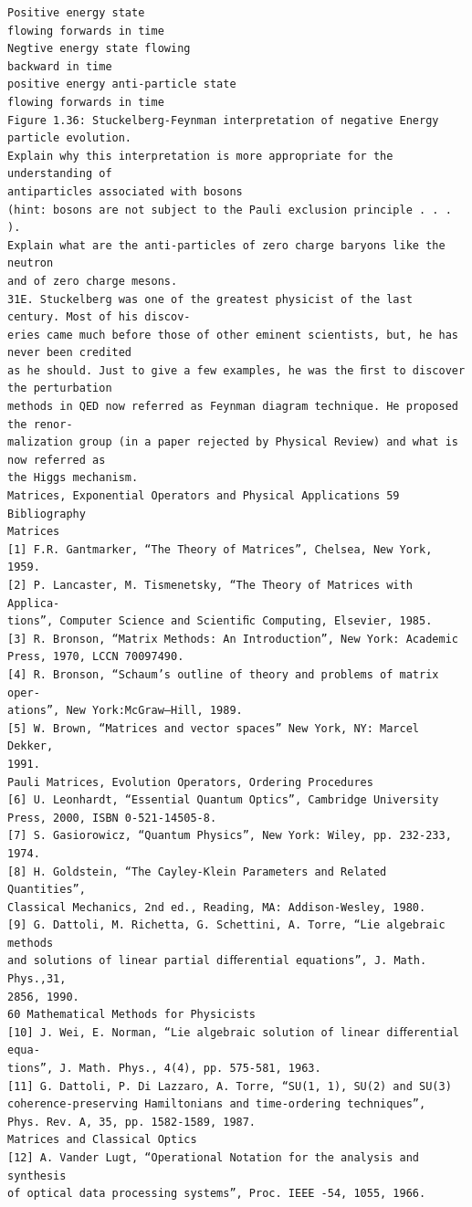 \begin{verbatim}
Positive energy state
flowing forwards in time
Negtive energy state flowing
backward in time
positive energy anti-particle state
flowing forwards in time
Figure 1.36: Stuckelberg-Feynman interpretation of negative Energy particle evolution.
Explain why this interpretation is more appropriate for the understanding of
antiparticles associated with bosons
(hint: bosons are not subject to the Pauli exclusion principle . . . ).
Explain what are the anti-particles of zero charge baryons like the neutron
and of zero charge mesons.
31E. Stuckelberg was one of the greatest physicist of the last century. Most of his discov-
eries came much before those of other eminent scientists, but, he has never been credited
as he should. Just to give a few examples, he was the ﬁrst to discover the perturbation
methods in QED now referred as Feynman diagram technique. He proposed the renor-
malization group (in a paper rejected by Physical Review) and what is now referred as
the Higgs mechanism.
Matrices, Exponential Operators and Physical Applications 59
Bibliography
Matrices
[1] F.R. Gantmarker, “The Theory of Matrices”, Chelsea, New York, 1959.
[2] P. Lancaster, M. Tismenetsky, “The Theory of Matrices with Applica-
tions”, Computer Science and Scientiﬁc Computing, Elsevier, 1985.
[3] R. Bronson, “Matrix Methods: An Introduction”, New York: Academic
Press, 1970, LCCN 70097490.
[4] R. Bronson, “Schaum’s outline of theory and problems of matrix oper-
ations”, New York:McGraw–Hill, 1989.
[5] W. Brown, “Matrices and vector spaces” New York, NY: Marcel Dekker,
1991.
Pauli Matrices, Evolution Operators, Ordering Procedures
[6] U. Leonhardt, “Essential Quantum Optics”, Cambridge University
Press, 2000, ISBN 0-521-14505-8.
[7] S. Gasiorowicz, “Quantum Physics”, New York: Wiley, pp. 232-233,
1974.
[8] H. Goldstein, “The Cayley-Klein Parameters and Related Quantities”,
Classical Mechanics, 2nd ed., Reading, MA: Addison-Wesley, 1980.
[9] G. Dattoli, M. Richetta, G. Schettini, A. Torre, “Lie algebraic methods
and solutions of linear partial diﬀerential equations”, J. Math. Phys.,31,
2856, 1990.
60 Mathematical Methods for Physicists
[10] J. Wei, E. Norman, “Lie algebraic solution of linear diﬀerential equa-
tions”, J. Math. Phys., 4(4), pp. 575-581, 1963.
[11] G. Dattoli, P. Di Lazzaro, A. Torre, “SU(1, 1), SU(2) and SU(3)
coherence-preserving Hamiltonians and time-ordering techniques”,
Phys. Rev. A, 35, pp. 1582-1589, 1987.
Matrices and Classical Optics
[12] A. Vander Lugt, “Operational Notation for the analysis and synthesis
of optical data processing systems”, Proc. IEEE -54, 1055, 1966.

\end{verbatim}
